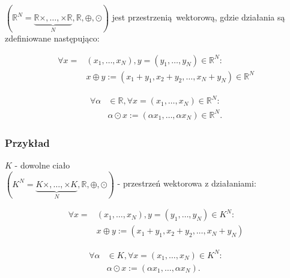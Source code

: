 \documentclass[a5paper,8pt]{article}
\begin{document}
    $ (\mathbb{R}^N = \underbrace{\mathbb{R} \times, \ldots, \times \mathbb{R}}_{N}, \mathbb{R}, \oplus, \odot) $ jest przestrzenią wektorową, gdzie działania są zdefiniowane następująco:

    \begin{equation*}
        \begin{split}
            \forall  x ={} & ( x_1, \ldots, x_N), y = (y_1, \ldots,y_N) \in \mathbb{R}^N: \\
            & x \oplus y := (x_1+y_1,x_2+y_2,\ldots,x_N+y_N) \in \mathbb{R}^N
        \end{split}
    \end{equation*}

    \begin{equation*}
        \begin{split}
            \forall  \alpha{} & \in \mathbb{R}, \forall x = ( x_1, \ldots, x_N) \in \mathbb{R}^N: \\
            & \alpha \odot x := (\alpha x_1,\ldots,\alpha x_N) \in \mathbb{R}^N.
        \end{split}
    \end{equation*}


    \subsubsection{Przykład} %
    \label{ssub:przyklad_2}

    $ K $ - dowolne ciało \\
    $ (K^N = \underbrace{K \times, \ldots, \times K}_{N}, \mathbb{R}, \oplus, \odot) $ - przestrzeń wektorowa z działaniami:

    \begin{equation*}
        \begin{split}
            \forall  x ={} & ( x_1, \ldots, x_N), y = (y_1, \ldots,y_N) \in K^N: \\
            & x \oplus y := (x_1+y_1,x_2+y_2,\ldots,x_N+y_N)
        \end{split}
    \end{equation*}

    \begin{equation*}
        \begin{split}
            \forall  \alpha{} & \in K, \forall x = ( x_1, \ldots, x_N) \in K^N: \\
            & \alpha \odot x := (\alpha x_1,\ldots,\alpha x_N).
        \end{split}
    \end{equation*}
    

\end{document}
